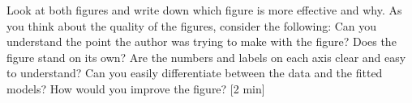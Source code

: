 \documentclass[12pt,letterpaper]{article}
\begin{document}
\begin{figure} 
			
		 
\end{figure} 


Look at both figures and write down which figure is more effective and why. As you think about the quality of the figures, consider the following: Can you understand the point the author was trying to make with the figure? Does the figure stand on its own?  Are the numbers and labels on each axis clear and easy to understand?  Can you easily differentiate between the data and the fitted models? How would you improve the figure? [2 min]\\\\\\\\\\\\\\\\\\\\
\end{document}

